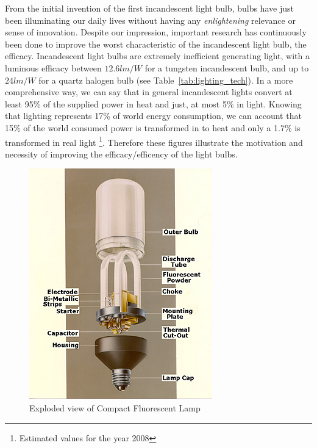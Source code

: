 From the initial invention of the first incandescent light bulb,  bulbs have just been illuminating our daily lives without having  any \emph{enlightening} relevance or sense of innovation. Despite our impression,  important research has continuously been done to improve the worst characteristic of the incandescent light bulb, the efficacy. Incandescent light bulbs are extremely inefficient generating light, with a luminous efficacy between $12.6 lm/W$ for a tungsten incandescent bulb, and  up to $24 lm/W$ for a quartz halogen bulb (see Table~\ref{tab:lighting_tech}). In a more comprehensive way, we can say that in general incandescent lights convert at least 95\% of the supplied power in heat and just, at most 5\% in light. Knowing that lighting represents 17\% of world energy consumption, we can account that 15\% of the world consumed power is transformed in to heat and only a 1.7\% is transformed in real light \footnote{Estimated values for the year 2008}. Therefore these figures illustrate  the motivation and necessity of improving the efficacy/efficency of the light bulbs.

\begin{figure}[!h]
\centering
\includegraphics{./0_intro/img/phil1b.jpg}
\caption{Exploded view of Compact Fluorescent Lamp }
\label{fig:philips_sl}
\end{figure}

